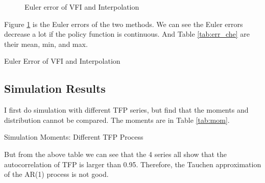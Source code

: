 \documentclass{article}
\begin{document}
	\begin{figure}[H]
		\centering
		\caption{Euler error of VFI and Interpolation}
		\label{fig:err_che}
	\end{figure}
	Figure \ref{fig:err_che} is the Euler errors of the two methods.
	We can see the Euler errors decrease a lot if the policy function is continuous.
	And Table \ref{tab:err_che} are their mean, min, and max.
	\begin{table}[H]
		\centering
		
		\caption{Euler Error of VFI and Interpolation}
		\label{tab:err_che}
	\end{table}
	
	\subsection{Simulation Results}
	
	I first do simulation with different TFP series, but find that the moments and distribution cannot be compared.
	The moments are in Table \ref{tab:mom}.
	\begin{table}[H]
		\centering
		
		\caption{Simulation Moments: Different TFP Process}
		\label{tab:mom}
	\end{table}
	
	But from the above table we can see that the 4 series all show that the autocorrelation of TFP is larger than 0.95.
	Therefore, the Tauchen approximation of the AR(1) process is not good.
	
\end{document}
